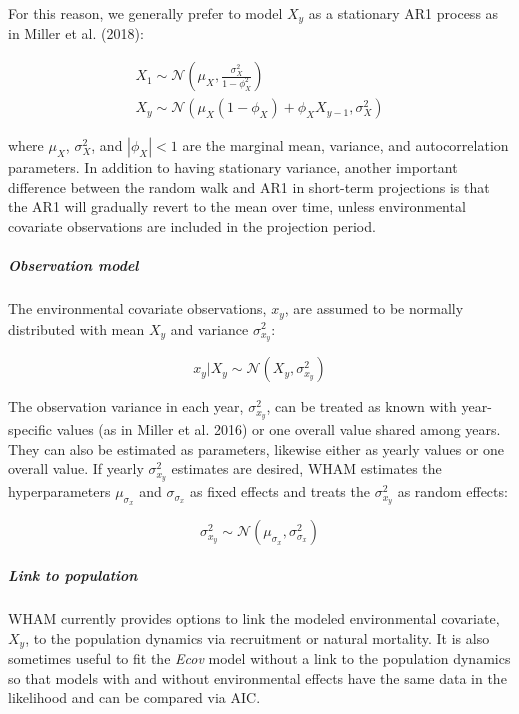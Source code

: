 \documentclass[]{article}
\let\oldsubparagraph\subparagraph
\renewcommand{\subparagraph}[1]{\oldsubparagraph{#1}\mbox{}}
\begin{document}
For this reason, we generally prefer to model \(X_y\) as a stationary
AR1 process as in Miller et al. (2018):

\begin{equation}
  \begin{array}{cc}
    X_1 \sim \mathcal{N} \left( \mu_X, \frac{\sigma^2_X}{1-\phi^2_X} \right) \\
    X_y \sim \mathcal{N} \left( \mu_X(1-\phi_X) + \phi_X X_{y-1}, \sigma^2_X \right)
  \end{array}
\end{equation}

where \(\mu_X\), \(\sigma^2_X\), and \(|\phi_X| < 1\) are the marginal
mean, variance, and autocorrelation parameters. In addition to having
stationary variance, another important difference between the random
walk and AR1 in short-term projections is that the AR1 will gradually
revert to the mean over time, unless environmental covariate
observations are included in the projection period.

\hypertarget{observation-model}{%
\subparagraph{Observation model}\label{observation-model}}

The environmental covariate observations, \(x_y\), are assumed to be
normally distributed with mean \(X_y\) and variance \(\sigma^2_{x_y}\):

\[x_y | X_y \sim \mathcal{N}\left( X_y, \sigma^2_{x_y} \right)\]

The observation variance in each year, \(\sigma^2_{x_y}\), can be
treated as known with year-specific values (as in Miller et al. 2016) or
one overall value shared among years. They can also be estimated as
parameters, likewise either as yearly values or one overall value. If
yearly \(\sigma^2_{x_y}\) estimates are desired, WHAM estimates the
hyperparameters \(\mu_{\sigma_x}\) and \(\sigma_{\sigma_x}\) as fixed
effects and treats the \(\sigma^2_{x_y}\) as random effects:

\[\sigma^2_{x_y} \sim \mathcal{N} \left( \mu_{\sigma_x}, \sigma^2_{\sigma_x} \right)\]

\hypertarget{link-to-population}{%
\subparagraph{Link to population}\label{link-to-population}}

WHAM currently provides options to link the modeled environmental
covariate, \(X_y\), to the population dynamics via recruitment or
natural mortality. It is also sometimes useful to fit the \emph{Ecov}
model without a link to the population dynamics so that models with and
without environmental effects have the same data in the likelihood and
can be compared via AIC.
\end{document}
